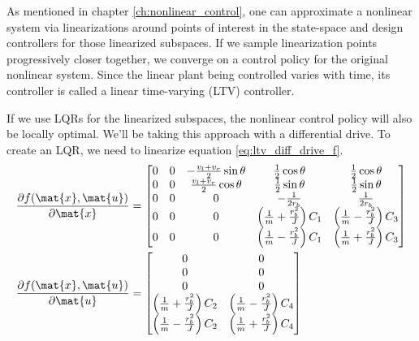 As mentioned in chapter \ref{ch:nonlinear_control}, one can approximate a
nonlinear system via linearizations around points of interest in the state-space
and design controllers for those linearized subspaces. If we sample
linearization points progressively closer together, we converge on a control
policy for the original nonlinear system. Since the linear \gls{plant} being
controlled varies with time, its controller is called a linear time-varying
(LTV) controller.

If we use LQRs for the linearized subspaces, the nonlinear control policy will
also be locally optimal. We'll be taking this approach with a differential
drive. To create an LQR, we need to linearize equation
\eqref{eq:ltv_diff_drive_f}.
\begin{align*}
  \frac{\partial f(\mat{x}, \mat{u})}{\partial\mat{x}} &=
  \begin{bmatrix}
    0 & 0 & -\frac{v_l + v_r}{2}\sin\theta & \frac{1}{2}\cos\theta &
      \frac{1}{2}\cos\theta \\
    0 & 0 & \frac{v_l + v_r}{2}\cos\theta & \frac{1}{2}\sin\theta &
      \frac{1}{2}\sin\theta \\
    0 & 0 & 0 & -\frac{1}{2r_b} & \frac{1}{2r_b} \\
    0 & 0 & 0 & \left(\frac{1}{m} + \frac{r_b^2}{J}\right) C_1 &
      \left(\frac{1}{m} - \frac{r_b^2}{J}\right) C_3 \\
    0 & 0 & 0 & \left(\frac{1}{m} - \frac{r_b^2}{J}\right) C_1 &
      \left(\frac{1}{m} + \frac{r_b^2}{J}\right) C_3
  \end{bmatrix} \\
  \frac{\partial f(\mat{x}, \mat{u})}{\partial\mat{u}} &=
  \begin{bmatrix}
    0 & 0 \\
    0 & 0 \\
    0 & 0 \\
    \left(\frac{1}{m} + \frac{r_b^2}{J}\right) C_2 &
    \left(\frac{1}{m} - \frac{r_b^2}{J}\right) C_4 \\
    \left(\frac{1}{m} - \frac{r_b^2}{J}\right) C_2 &
    \left(\frac{1}{m} + \frac{r_b^2}{J}\right) C_4
  \end{bmatrix}
\end{align*}


